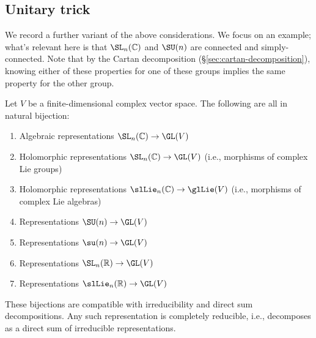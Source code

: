 \documentclass[reqno]{amsart} 
\begin{document}
\subsection{Unitary trick}\label{sec:cnh2voujmc}
We record a further variant of the above considerations.  We focus on an example; what's relevant here is that $\SL_n(\mathbb{C})$ and $\SU(n)$ are connected and simply-connected.  Note that by the Cartan decomposition (\S\ref{sec:cartan-decomposition}), knowing either of these properties for one of these groups implies the same property for the other group.
\begin{theorem}\label{thm:unitary-trick}
  Let $V$ be a finite-dimensional complex vector space.  The following are all in natural bijection:
  \begin{enumerate}
  \item Algebraic representations $\SL_n(\mathbb{C}) \rightarrow \GL(V)$
  \item Holomorphic representations $\SL_n(\mathbb{C}) \rightarrow \GL(V)$ (i.e., morphisms of complex Lie groups)
  \item Holomorphic representations $\slLie_n(\mathbb{C}) \rightarrow \glLie(V)$ (i.e., morphisms of complex Lie algebras)
  \item Representations $\SU(n) \rightarrow \GL(V)$
  \item Representations $\su(n) \rightarrow \GL(V)$
  \item Representations $\SL_n(\mathbb{R}) \rightarrow \GL(V)$
  \item Representations $\slLie_n(\mathbb{R}) \rightarrow \GL(V)$
  \end{enumerate}
  These bijections are compatible with irreducibility and direct sum decompositions.  Any such representation is completely reducible, i.e., decomposes as a direct sum of irreducible representations.
\end{theorem}
\end{document}
